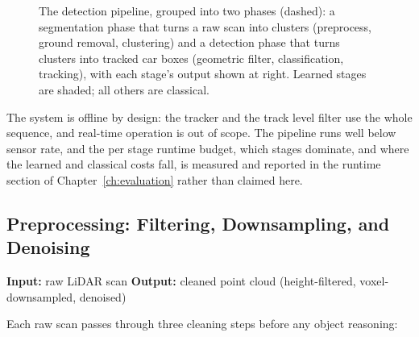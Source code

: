 \documentclass[a4paper,12pt]{report}
\begin{document}
\begin{figure}[H]
  \caption[Detection pipeline]{The detection pipeline, grouped into two phases (dashed): a
    segmentation phase that turns a raw scan into clusters (preprocess, ground removal,
    clustering) and a detection phase that turns clusters into tracked car boxes
    (geometric filter, classification, tracking), with each stage's output shown at right.
    Learned stages are shaded; all others are classical.}
  \label{fig:pipeline}
\end{figure}

The system is offline by design: the tracker and the track level filter
use the whole sequence, and real-time operation is out of scope. The pipeline runs well
below sensor rate, and the per stage runtime budget, which stages dominate, and where
the learned and classical costs fall, is measured and reported in the runtime section
of Chapter~\ref{ch:evaluation} rather than claimed here.

\subsection{Preprocessing: Filtering, Downsampling, and Denoising}
\label{sec:pipeline-preprocess}

\noindent \textbf{Input:} raw LiDAR scan \quad \textbar \quad \textbf{Output:} cleaned point cloud (height-filtered, voxel-downsampled, denoised) \vspace{0.5em}

Each raw scan passes through three cleaning steps
before any object reasoning:
\end{document}
